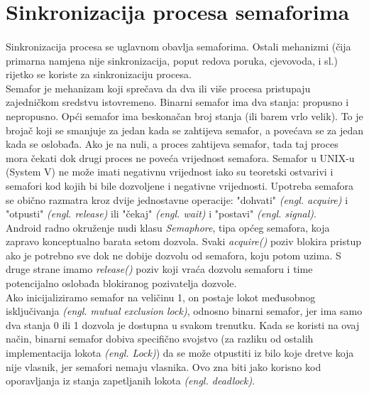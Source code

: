 \documentclass[times, utf8, zavrsni]{fer}
\begin{document}
\section{Sinkronizacija procesa semaforima}
\paragraph{}
Sinkronizacija procesa se uglavnom obavlja semaforima. Ostali mehanizmi (čija primarna namjena nije sinkronizacija, poput redova poruka, cjevovoda, i sl.) rijetko se koriste za sinkronizaciju procesa.\\

Semafor je mehanizam koji sprečava da dva ili više procesa pristupaju zajedničkom sredstvu istovremeno. Binarni semafor ima dva stanja: propusno i nepropusno. Opći semafor ima beskonačan broj stanja (ili barem vrlo velik). To je brojač koji se smanjuje za jedan kada se zahtijeva semafor, a povećava se za jedan kada se oslobađa. Ako je na nuli, a proces zahtijeva semafor, tada taj proces mora čekati dok drugi proces ne poveća vrijednost semafora. Semafor u UNIX-u (System V) ne može imati negativnu vrijednost iako su teoretski ostvarivi i semafori kod kojih bi bile dozvoljene i negativne vrijednosti. Upotreba semafora se obično razmatra kroz dvije jednostavne operacije: "dohvati" \textit{(engl. acquire)} i "otpusti" \textit{(engl. release)} ili "čekaj" \textit{(engl. wait)} i "postavi" \textit{(engl. signal)}.\\

Android radno okruženje nudi klasu \textit{Semaphore}, tipa općeg semafora, koja zapravo konceptualno barata setom dozvola. Svaki \textit{acquire()} poziv blokira pristup ako je potrebno sve dok ne dobije dozvolu od semafora, koju potom uzima. S druge strane imamo \textit{release()} poziv koji vraća dozvolu semaforu i time potencijalno oslobađa blokiranog pozivatelja dozvole.\\

Ako inicijaliziramo semafor na veličinu 1, on postaje lokot međusobnog isključivanja \textit{(engl. mutual exclusion lock)}, odnosno binarni semafor, jer ima samo dva stanja 0 ili 1 dozvola je dostupna u svakom trenutku. Kada se koristi na ovaj način, binarni semafor dobiva specifično svojstvo (za razliku od ostalih implementacija lokota \textit{(engl. Lock)}) da se može otpustiti iz bilo koje dretve koja nije vlasnik, jer semafori nemaju vlasnika. Ovo zna biti jako korisno kod oporavljanja iz stanja zapetljanih lokota \textit{(engl. deadlock)}.\\
\end{document}
